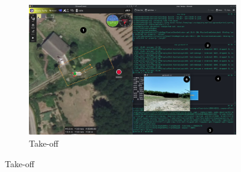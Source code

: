 \begin{figure}[!hbt]
  \centering
  \begin{subfigure}[t]{\textwidth}
    \centering
    \includegraphics[width=1.0\textwidth]{./img/png/bao-fpv-takeoff-annot} 
    \caption{Take-off}%
    \label{fig:mission-exec-case1}
  \end{subfigure}
  

\end{figure}
